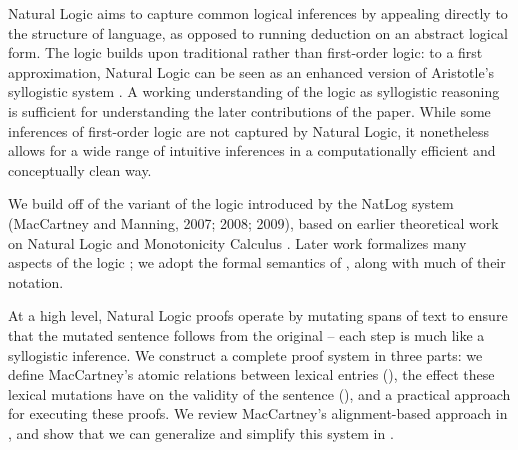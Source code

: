 Natural Logic aims to capture common logical
  inferences by appealing directly to the structure of language,
  as opposed to running deduction on an abstract logical form.
The logic builds upon traditional rather than first-order logic:
  to a first approximation, Natural Logic can be seen as
  an enhanced version of Aristotle's syllogistic system
  \cite{key:2008vanbenthem-natlog}.
A working understanding of the logic as syllogistic reasoning
  is sufficient for understanding the later contributions of the paper.
While some inferences of first-order logic are not captured by 
  Natural Logic,
  it nonetheless allows for a wide range of intuitive inferences in
  a computationally efficient and conceptually clean way.

We build off of the variant of the logic introduced by
  the NatLog system (MacCartney and Manning, 2007; 2008; 2009),
  \nocite{key:2007maccartney-natlog}
  \nocite{key:2008maccartney-natlog}
  \nocite{key:2009maccartney-natlog}
  based on earlier theoretical work on Natural Logic and 
  Monotonicity Calculus
  \cite{key:1986benthem-natlog,key:1991valencia-natlog}.
Later work formalizes many aspects of the logic
  \cite{key:2012icard-natlog,key:2013djalali-natlog};
  we adopt the formal semantics of
  , along with much of their
  notation.

At a high level, Natural Logic proofs operate by mutating spans of text
  to ensure that the mutated sentence follows from the
  original -- each step is much like a syllogistic inference.
We construct a complete proof system in three parts:
  we define MacCartney's atomic relations between lexical entries
  (), the effect these lexical mutations have
  on the validity of the sentence (),
  and a practical approach for executing these proofs.
We review MacCartney's alignment-based approach in
  , and show that we can generalize and
  simplify this system in .

